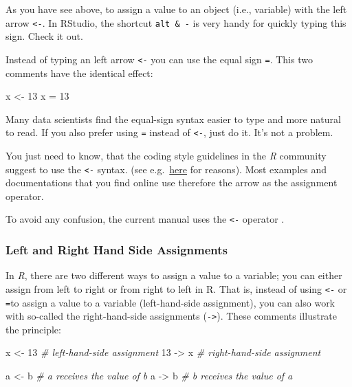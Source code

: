 \documentclass[
]{scrartcl}
\newenvironment{Shaded}{\begin{snugshade}}{\end{snugshade}}
\newcommand{\CommentTok}[1]{\textcolor[rgb]{0.56,0.35,0.01}{\textit{#1}}}
\newcommand{\DecValTok}[1]{\textcolor[rgb]{0.00,0.00,0.81}{#1}}
\newcommand{\NormalTok}[1]{#1}
\newcommand{\StringTok}[1]{\textcolor[rgb]{0.31,0.60,0.02}{#1}}
\begin{document}
As you have see above, to assign a value to an object (i.e., variable) with the left arrow \texttt{\textless{}-}. In RStudio, the shortcut \texttt{alt\ \&\ -} is very handy for quickly typing this sign. Check it out.

Instead of typing an left arrow \texttt{\textless{}-} you can use the equal sign \texttt{=}. This two comments have the identical effect:

\begin{Shaded}
\begin{Highlighting}[]
\NormalTok{x \textless{}{-}}\StringTok{ }\DecValTok{13}
\NormalTok{x =}\StringTok{ }\DecValTok{13}
\end{Highlighting}
\end{Shaded}

Many data scientists find the equal-sign syntax easier to type and more natural to read. If you also prefer using \texttt{=} instead of \texttt{\textless{}-}, just do it. It's not a problem.

You just need to know, that the coding style guidelines in the \emph{R} community suggest to use the \texttt{\textless{}-} syntax. (see e.g.~\href{https://www.r-bloggers.com/why-do-we-use-arrow-as-an-assignment-operator/}{here} for reasons). Most examples and documentations that you find online use therefore the arrow as the assignment operator.

To avoid any confusion, the current manual uses the \texttt{\textless{}-} operator .

\hypertarget{left-and-right-hand-side-assignments}{%
\subsubsection{Left and Right Hand Side Assignments}\label{left-and-right-hand-side-assignments}}

In \emph{R}, there are two different ways to assign a value to a variable; you can either assign from left to right or from right to left in R. That is, instead of using \texttt{\textless{}-} or \texttt{=}to assign a value to a variable (left-hand-side assignment), you can also work with so-called the right-hand-side assignments (\texttt{-\textgreater{}}). These comments illustrate the principle:

\begin{Shaded}
\begin{Highlighting}[]
\NormalTok{x \textless{}{-}}\StringTok{ }\DecValTok{13}       \CommentTok{\# left{-}hand{-}side assignment}
\DecValTok{13}\NormalTok{ {-}\textgreater{}}\StringTok{ }\NormalTok{x       }\CommentTok{\# right{-}hand{-}side assignment}

\NormalTok{a \textless{}{-}}\StringTok{ }\NormalTok{b        }\CommentTok{\# a receives the value of b}
\NormalTok{a {-}\textgreater{}}\StringTok{ }\NormalTok{b        }\CommentTok{\# b receives the value of a}
\end{Highlighting}
\end{Shaded}
\end{document}
